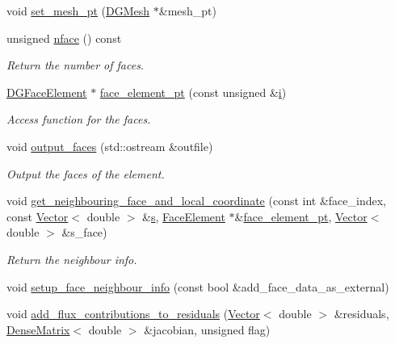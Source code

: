 \begin{DoxyCompactItemize}
void \hyperlink{classoomph_1_1DGElement_a8908504165b2d6bd3e2429a08160fd2b}{set\+\_\+mesh\+\_\+pt} (\hyperlink{classoomph_1_1DGMesh}{D\+G\+Mesh} $\ast$\&mesh\+\_\+pt)
\item 
unsigned \hyperlink{classoomph_1_1DGElement_a76598661987374a484d75d626f9bc13b}{nface} () const
\begin{DoxyCompactList}\small\item\em Return the number of faces. \end{DoxyCompactList}\item 
\hyperlink{classoomph_1_1DGFaceElement}{D\+G\+Face\+Element} $\ast$ \hyperlink{classoomph_1_1DGElement_ac4df080229516b2ceb1c045f57cb9b6d}{face\+\_\+element\+\_\+pt} (const unsigned \&\hyperlink{cfortran_8h_adb50e893b86b3e55e751a42eab3cba82}{i})
\begin{DoxyCompactList}\small\item\em Access function for the faces. \end{DoxyCompactList}\item 
void \hyperlink{classoomph_1_1DGElement_ab4d6f236fcfaca280473ad9177b296e9}{output\+\_\+faces} (std\+::ostream \&outfile)
\begin{DoxyCompactList}\small\item\em Output the faces of the element. \end{DoxyCompactList}\item 
void \hyperlink{classoomph_1_1DGElement_aca2f5466e8f969d671ba71b976153629}{get\+\_\+neighbouring\+\_\+face\+\_\+and\+\_\+local\+\_\+coordinate} (const int \&face\+\_\+index, const \hyperlink{classoomph_1_1Vector}{Vector}$<$ double $>$ \&\hyperlink{cfortran_8h_ab7123126e4885ef647dd9c6e3807a21c}{s}, \hyperlink{classoomph_1_1FaceElement}{Face\+Element} $\ast$\&\hyperlink{classoomph_1_1DGElement_ac4df080229516b2ceb1c045f57cb9b6d}{face\+\_\+element\+\_\+pt}, \hyperlink{classoomph_1_1Vector}{Vector}$<$ double $>$ \&s\+\_\+face)
\begin{DoxyCompactList}\small\item\em Return the neighbour info. \end{DoxyCompactList}\item 
void \hyperlink{classoomph_1_1DGElement_a318f2799a91b674c9420e4fc1da5c055}{setup\+\_\+face\+\_\+neighbour\+\_\+info} (const bool \&add\+\_\+face\+\_\+data\+\_\+as\+\_\+external)
\item 
void \hyperlink{classoomph_1_1DGElement_a5eaf138a13233e7a3eeb86ccda8d6edb}{add\+\_\+flux\+\_\+contributions\+\_\+to\+\_\+residuals} (\hyperlink{classoomph_1_1Vector}{Vector}$<$ double $>$ \&residuals, \hyperlink{classoomph_1_1DenseMatrix}{Dense\+Matrix}$<$ double $>$ \&jacobian, unsigned flag)

\end{DoxyCompactItemize}
